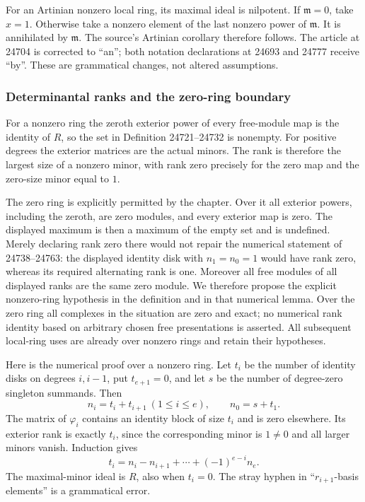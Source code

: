 For an Artinian nonzero local ring, its maximal ideal is nilpotent. If \(\mathfrak m=0\), take \(x=1\). Otherwise take a nonzero element of the last nonzero power of \(\mathfrak m\). It is annihilated by \(\mathfrak m\). The source's Artinian corollary therefore follows. The article at 24704 is corrected to ``an''; both notation declarations at 24693 and 24777 receive ``by''. These are grammatical changes, not altered assumptions.

\subsubsection{Determinantal ranks and the zero-ring boundary}\label{algebra-proof-018-determinantal-ranks-and-the-zero-ring-boundary}

For a nonzero ring the zeroth exterior power of every free-module map is the identity of \(R\), so the set in Definition 24721--24732 is nonempty. For positive degrees the exterior matrices are the actual minors. The rank is therefore the largest size of a nonzero minor, with rank zero precisely for the zero map and the zero-size minor equal to \(1\).

The zero ring is explicitly permitted by the chapter. Over it all exterior powers, including the zeroth, are zero modules, and every exterior map is zero. The displayed maximum is then a maximum of the empty set and is undefined. Merely declaring rank zero there would not repair the numerical statement of 24738--24763: the displayed identity disk with \(n_1=n_0=1\) would have rank zero, whereas its required alternating rank is one. Moreover all free modules of all displayed ranks are the same zero module. We therefore propose the explicit nonzero-ring hypothesis in the definition and in that numerical lemma. Over the zero ring all complexes in the situation are zero and exact; no numerical rank identity based on arbitrary chosen free presentations is asserted. All subsequent local-ring uses are already over nonzero rings and retain their hypotheses.

Here is the numerical proof over a nonzero ring. Let \(t_i\) be the number of identity disks on degrees \(i,i-1\), put \(t_{e+1}=0\), and let \(s\) be the number of degree-zero singleton summands. Then \[
 n_i=t_i+t_{i+1}\ (1\le i\le e),\qquad n_0=s+t_1.
\] The matrix of \(\varphi_i\) contains an identity block of size \(t_i\) and is zero elsewhere. Its exterior rank is exactly \(t_i\), since the corresponding minor is \(1\ne0\) and all larger minors vanish. Induction gives \[
 t_i=n_i-n_{i+1}+\cdots+(-1)^{e-i}n_e .
\] The maximal-minor ideal is \(R\), also when \(t_i=0\). The stray hyphen in ``\(r_{i+1}\)-basis elements'' is a grammatical error.

